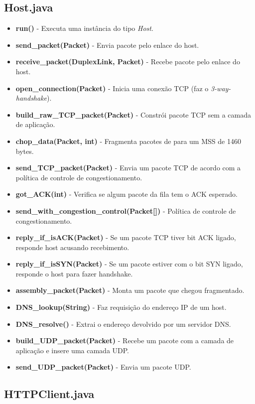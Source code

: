 \documentclass[11pt]{article}
\begin{document}
\subsection{Host.java}

\begin{itemize}
	\item \textbf{run()} - Executa uma instância do tipo \textit{Host}.
	\item \textbf{send_packet(Packet)} - Envia pacote pelo enlace do host.
	\item \textbf{receive_packet(DuplexLink, Packet)} - Recebe pacote pelo enlace do host.
	\item \textbf{open_connection(Packet)} - Inicia uma conexão TCP (faz o \textit{3-way-handshake}).
	\item \textbf{build_raw_TCP_packet(Packet)} - Constrói pacote TCP sem a camada de aplicação.
	\item \textbf{chop_data(Packet, int)} - Fragmenta pacotes de para um MSS de 1460 bytes.
	\item \textbf{send_TCP_packet(Packet)} - Envia um pacote TCP de acordo com a política de controle de congestionamento.
	\item \textbf{got_ACK(int)} - Verifica se algum pacote da fila tem o ACK esperado.
	\item \textbf{send_with_congestion_control(Packet[])} - Política de controle de congestionamento.
	\item \textbf{reply_if_isACK(Packet)} - Se um pacote TCP tiver bit ACK ligado, responde host acusando recebimento.
	\item \textbf{reply_if_isSYN(Packet)} - Se um pacote estiver com o bit SYN ligado, responde o host para fazer handshake.
	\item \textbf{assembly_packet(Packet)} - Monta um pacote que chegou fragmentado.
	\item \textbf{DNS_lookup(String)} - Faz requisição do endereço IP de um host.
	\item \textbf{DNS_resolve()} - Extrai o endereço devolvido por um servidor DNS.
	\item \textbf{build_UDP_packet(Packet)} - Recebe um pacote com a camada de aplicação e insere uma camada UDP.
	\item \textbf{send_UDP_packet(Packet)} - Envia um pacote UDP.
\end{itemize}

\subsection{HTTPClient.java}
\end{document}
